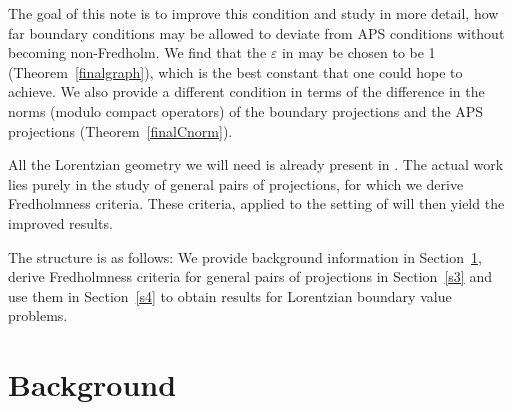 \documentclass[10pt,a4paper]{amsart}
\numberwithin{equation}{section}
\begin{document}
The goal of this note is to improve this condition and study in more detail, how far boundary conditions may be allowed to deviate from APS conditions without becoming non-Fredholm. We find that the $\varepsilon$ in \cite[Proposition~4.5]{BH} may be chosen to be 1 (Theorem~\ref{finalgraph}), which is the best constant that one could hope to achieve. We also provide a different condition in terms of the difference in the norms (modulo compact operators) of the boundary projections and the APS projections (Theorem~\ref{finalCnorm}).
	
	All the Lorentzian geometry we will need is already present in \cite{BH}. The actual work lies purely in the study of general pairs of projections, for which we derive Fredholmness criteria. These criteria, applied to the setting of \cite{BH} will then yield the improved results.
	
	The structure is as follows: We provide background information in Section~\ref{s2}, derive Fredholmness criteria for general pairs of projections in Section~\ref{s3} and use them in Section~\ref{s4} to obtain results for Lorentzian boundary value problems.
	
\section{Background}\label{s2}
\end{document}
